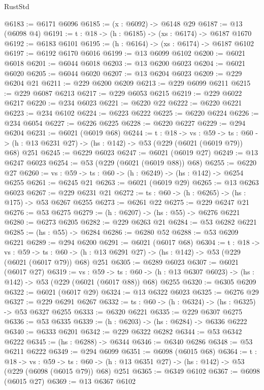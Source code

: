 \begin{lexlean}{RustStd}
\begin{coremodule}
@6183 := @6171 @6096
@6185 := (x : @6092) -> @6148 @29
@6187 := @13 (@6098 @4)
@6191 := {t : @18} -> (h : @6185) -> (xs : @6174) -> @6187 @1670
@6192 := @6183 @6101
@6195 := (h : @6164) -> (xs : @6174) -> @6187 @6102
@6197 := @6192 @6170 @6016
@6199 := @13 @6099 @6102
@6200 := @6021 @6018
@6201 := @6044 @6018
@6203 := @13 @6200 @6023
@6204 := @6021 @6020
@6205 := @6044 @6020
@6207 := @13 @6204 @6023
@6209 := @229 @6204 @21
@6211 := @229 @6200 @6209
@6213 := @229 @6099 @6211
@6215 := @229 @6087 @6213
@6217 := @229 @6053 @6215
@6219 := @229 @6022 @6217
@6220 := @234 @6023
@6221 := @6220 @22
@6222 := @6220 @6221
@6223 := @234 @6102
@6224 := @6223 @6222
@6225 := @6220 @6224
@6226 := @234 @6054
@6227 := @6226 @6225
@6228 := @6220 @6227
@6229 := @294 @6204
@6231 := @6021 (@6019 @68)
@6244 := {t : @18} ->
  {vs : @59} ->
  {ts : @60} -> (h : @13 @6231 @27) -> (hs : @142) -> @53 (@229 (@6021 (@6019 @79)) @68) @251
@6245 := @6229 @6023
@6247 := @6021 (@6019 @27)
@6249 := @13 @6247 @6023
@6254 := @53 (@229 (@6021 (@6019 @88)) @68)
@6255 := @6220 @27
@6260 := {vs : @59} -> {ts : @60} -> (h : @6249) -> (hs : @142) -> @6254 @6255
@6261 := @6245 @21
@6263 := @6021 (@6019 @29)
@6265 := @13 @6263 @6023
@6267 := @229 @6231 @21
@6272 := {ts : @60} -> (h : @6265) -> (hs : @175) -> @53 @6267 @6255
@6273 := @6261 @22
@6275 := @229 @6247 @21
@6276 := @53 @6275
@6279 := (h : @6207) -> (hs : @55) -> @6276 @6221
@6280 := @6273 @6205
@6282 := @229 @6263 @21
@6284 := @53 @6282 @6221
@6285 := (hs : @55) -> @6284
@6286 := @6280 @52
@6288 := @53 @6209 @6221
@6289 := @294 @6200
@6291 := @6021 (@6017 @68)
@6304 := {t : @18} ->
  {vs : @59} ->
  {ts : @60} -> (h : @13 @6291 @27) -> (hs : @142) -> @53 (@229 (@6021 (@6017 @79)) @68) @251
@6305 := @6289 @6023
@6307 := @6021 (@6017 @27)
@6319 := {vs : @59} ->
  {ts : @60} -> (h : @13 @6307 @6023) -> (hs : @142) -> @53 (@229 (@6021 (@6017 @88)) @68) @6255
@6320 := @6305 @6209
@6322 := @6021 (@6017 @29)
@6324 := @13 @6322 @6023
@6325 := @6276 @29
@6327 := @229 @6291 @6267
@6332 := {ts : @60} -> (h : @6324) -> (hs : @6325) -> @53 @6327 @6255
@6333 := @6320 @6221
@6335 := @229 @6307 @6275
@6336 := @53 @6335
@6339 := (h : @6203) -> (hs : @6284) -> @6336 @6222
@6340 := @6333 @6201
@6342 := @229 @6322 @6282
@6344 := @53 @6342 @6222
@6345 := (hs : @6288) -> @6344
@6346 := @6340 @6286
@6348 := @53 @6211 @6222
@6349 := @294 @6099
@6351 := @6098 (@6015 @68)
@6364 := {t : @18} ->
  {vs : @59} ->
  {ts : @60} -> (h : @13 @6351 @27) -> (hs : @142) -> @53 (@229 (@6098 (@6015 @79)) @68) @251
@6365 := @6349 @6102
@6367 := @6098 (@6015 @27)
@6369 := @13 @6367 @6102

\end{coremodule}
\end{lexlean}
